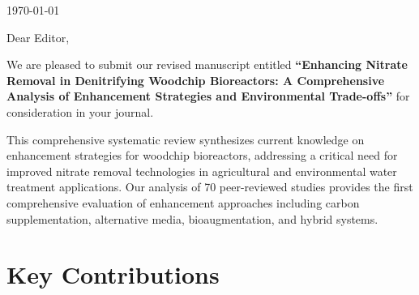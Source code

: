 \documentclass[12pt,a4paper]{article}
\begin{document}
\begin{flushright}
\today
\end{flushright}

\vspace{1cm}

\noindent Dear Editor,

\vspace{0.5cm}

We are pleased to submit our revised manuscript entitled \textbf{``Enhancing Nitrate Removal in Denitrifying Woodchip Bioreactors: A Comprehensive Analysis of Enhancement Strategies and Environmental Trade-offs''} for consideration in your journal.

This comprehensive systematic review synthesizes current knowledge on enhancement strategies for woodchip bioreactors, addressing a critical need for improved nitrate removal technologies in agricultural and environmental water treatment applications. Our analysis of 70 peer-reviewed studies provides the first comprehensive evaluation of enhancement approaches including carbon supplementation, alternative media, bioaugmentation, and hybrid systems.

\section*{Key Contributions}
\end{document}
